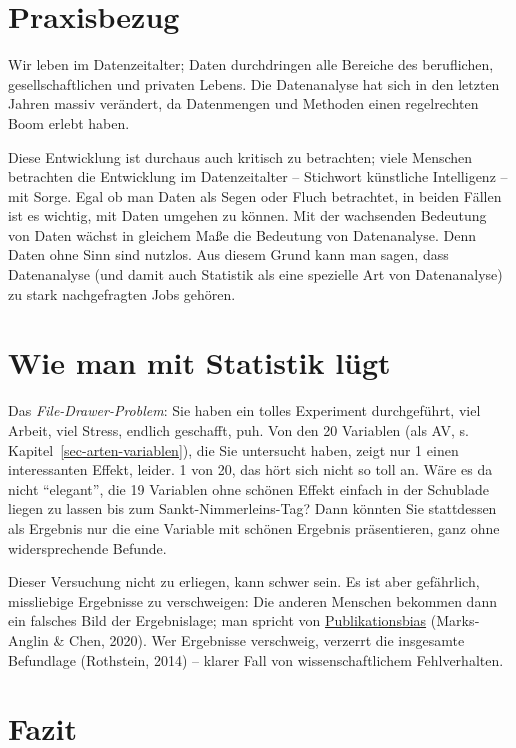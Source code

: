 \documentclass[
  letterpaper,
]{scrbook}
\theoremstyle{definition}
\theoremstyle{definition}
\theoremstyle{definition}
\theoremstyle{remark}
\begin{document}
\section{Praxisbezug}\label{praxisbezug}

Wir leben im Datenzeitalter; Daten durchdringen alle Bereiche des
beruflichen, gesellschaftlichen und privaten Lebens. Die Datenanalyse
hat sich in den letzten Jahren massiv verändert, da Datenmengen und
Methoden einen regelrechten Boom erlebt haben.

Diese Entwicklung ist durchaus auch kritisch zu betrachten; viele
Menschen betrachten die Entwicklung im Datenzeitalter -- Stichwort
künstliche Intelligenz -- mit Sorge. Egal ob man Daten als Segen oder
Fluch betrachtet, in beiden Fällen ist es wichtig, mit Daten umgehen zu
können. Mit der wachsenden Bedeutung von Daten wächst in gleichem Maße
die Bedeutung von Datenanalyse. Denn Daten ohne Sinn sind nutzlos. Aus
diesem Grund kann man sagen, dass Datenanalyse (und damit auch Statistik
als eine spezielle Art von Datenanalyse) zu stark nachgefragten Jobs
gehören.

\section{Wie man mit Statistik
lügt}\label{wie-man-mit-statistik-luxfcgt}

Das \emph{File-Drawer-Problem}: Sie haben ein tolles Experiment
durchgeführt, viel Arbeit, viel Stress, endlich geschafft, puh. Von den
20 Variablen (als AV, s. Kapitel~\ref{sec-arten-variablen}), die Sie
untersucht haben, zeigt nur 1 einen interessanten Effekt, leider. 1 von
20, das hört sich nicht so toll an. Wäre es da nicht ``elegant'', die 19
Variablen ohne schönen Effekt einfach in der Schublade liegen zu lassen
bis zum Sankt-Nimmerleins-Tag? Dann könnten Sie stattdessen als Ergebnis
nur die eine Variable mit schönen Ergebnis präsentieren, ganz ohne
widersprechende Befunde.

Dieser Versuchung nicht zu erliegen, kann schwer sein. Es ist aber
gefährlich, missliebige Ergebnisse zu verschweigen: Die anderen Menschen
bekommen dann ein falsches Bild der Ergebnislage; man spricht von
\href{https://de.wikipedia.org/wiki/Publikationsbias}{Publikationsbias}
(Marks‐Anglin \& Chen, 2020). Wer Ergebnisse verschweig, verzerrt die
insgesamte Befundlage (Rothstein, 2014) -- klarer Fall von
wissenschaftlichem Fehlverhalten.

\section{Fazit}\label{fazit-1}
\end{document}
